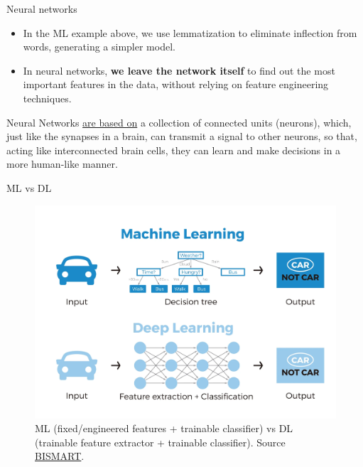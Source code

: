 \documentclass{beamer}
\begin{document}
\begin{frame}{Neural networks}
    \begin{itemize}
        \item In the ML example above, we use lemmatization to eliminate inflection from words, generating a simpler model.
        \item In neural networks, {\bf we leave the network itself} to find out the most important features in the data, without relying on feature engineering techniques. 
    \end{itemize}
    Neural Networks \href{https://towardsdatascience.com/deep-learning-with-python-neural-networks-complete-tutorial-6b53c0b06af0}{are based on} a collection of connected units (neurons), which, just like the synapses in a brain, can transmit a signal to other neurons, so that, acting like interconnected brain cells, they can learn and make decisions in a more human-like manner.\cite{nielsen_neural_2015}
\end{frame}

\begin{frame}{ML vs DL}
    \begin{figure}
        \includegraphics[width=0.7\linewidth]{MLvsDL}
        \caption{ML (fixed/engineered features + trainable classifier) vs DL (trainable feature extractor + trainable classifier). Source \href{https://blog.bismart.com/diferencia-machine-learning-deep-learning}{BISMART}. }
        \label{Fig:MLvsDL}
    \end{figure}
\end{frame}
\end{document}
